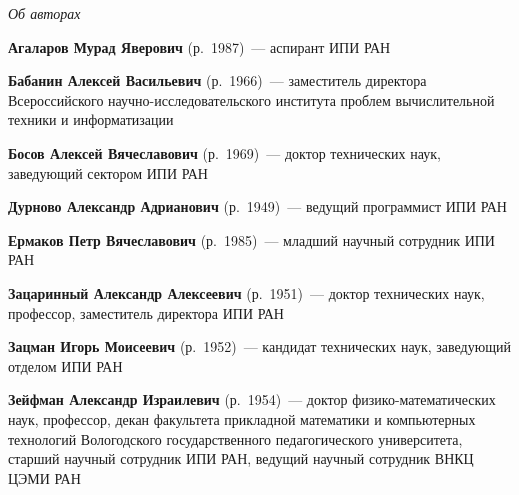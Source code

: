 \begin{center}\LARGE
\textit{Об авторах}
\end{center}

\thispagestyle{empty}



\vspace*{48pt}


\begin{multicols}{2}

\noindent
\textbf{Агаларов Мурад Яверович} (р.\ 1987)~--- 
аспирант ИПИ РАН

\vspace*{2pt}

\noindent
\textbf{Бабанин Алексей Васильевич} (р.\ 1966)~--- заместитель директора 
Всероссийского на\-уч\-но-ис\-сле\-до\-ва\-тель\-ско\-го института проблем 
вычислительной техники и информатизации

\vspace*{2pt}

\noindent
\textbf{Босов Алексей Вячеславович} (р.\ 1969)~--- доктор технических наук, заведующий
сектором ИПИ РАН

\vspace*{2pt}


\noindent
\textbf{Дурново Александр Адрианович} (р.\ 1949)~--- ведущий программист ИПИ РАН

\vspace*{2pt}

\noindent
\textbf{Ермаков Петр Вячеславович} (р.\ 1985)~--- младший научный сотрудник ИПИ РАН

\vspace*{2pt}

\noindent
\textbf{Зацаринный Александр Алексеевич} (р.\ 1951)~--- доктор технических наук, 
профессор, заместитель директора ИПИ РАН 

\vspace*{2pt}

\noindent
\textbf{Зацман Игорь Моисеевич} (р.\ 1952)~--- кандидат технических наук, 
заведующий отделом ИПИ РАН


\vspace*{2pt}

\noindent
\textbf{Зейфман Александр Израилевич} (р.\ 1954)~--- доктор
физико-математических наук, профессор, декан факультета прикладной
математики и компьютерных технологий Вологодского государственного
педагогического университета, старший научный сотрудник ИПИ РАН,
ведущий научный сотрудник ВНКЦ ЦЭМИ РАН


\end{multicols}
